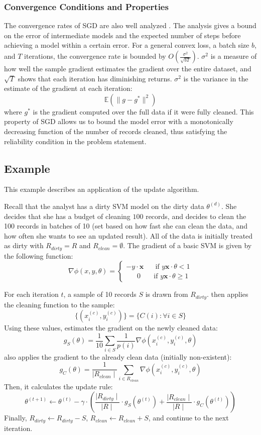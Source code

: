 \subsubsection{Convergence Conditions and Properties}
The convergence rates of SGD are also well analyzed \cite{dekel2012optimal,bertsekas2011incremental,zhao2014stochastic}. 
The analysis gives a bound on the error of intermediate models and the expected number of steps before achieving a model within a certain error. 
For a general convex loss, a batch size $b$, and $T$ iterations, the convergence rate is bounded by $O(\frac{\sigma^2}{\sqrt{bT}})$. 
$\sigma^2$ is a measure of how well the sample gradient estimates the gradient over the entire dataset, and $\sqrt{T}$ shows that each iteration has diminishing returns.
$\sigma^2$ is the variance in the estimate of the gradient at each iteration:
\[
\mathbb{E}(\|g - g^*\|^2)
\]
where $g^*$ is the gradient computed over the full data if it were fully cleaned.
This property of SGD allows us to bound the model error with a monotonically decreasing function of the number of records cleaned, thus satisfying the reliability condition in the problem statement.

\subsection{Example}
This example describes an application of the update algorithm.
\begin{example}\label{upex}
Recall that the analyst has a dirty SVM model on the dirty data $\theta^{(d)}$.
She decides that she has a budget of cleaning $100$ records, and decides to clean the 100 records in batches of 10 (set based on how fast she can clean the data, and how often she wants to see an updated result).
All of the data is initially treated as dirty with $R_{dirty} = R$ and $R_{clean} = \emptyset$.
The gradient of a basic SVM is given by the following function:
\[
\nabla\phi(x,y,\theta) =
\begin{cases}      
-y\cdot\boldsymbol{x} ~~~~~~ \text{ if } y\boldsymbol{x}\cdot\theta < 1 \\
~~~~~~~0\ ~~~~~~\text{ if } y\boldsymbol{x}\cdot\theta \geq 1      
\end{cases}
\]

For each iteration $t$, a sample of 10 records $S$ is drawn from $R_{dirty}$.
\sys then applies the cleaning function to the sample:
\[
\{(x_i^{(c)},y_i^{(c)})\} = \{C(i): \forall i \in S\}
\]
Using these values, \sys estimates the gradient on the newly cleaned data:
\[
g_{S}(\theta) = \frac{1}{10} \sum_{i \in S}\frac{1}{p(i)}\nabla\phi(x_i^{(c)},y_i^{(c)},\theta)
\]
\sys also applies the gradient to the already clean data (initially non-existent):
\[
g_C(\theta) = \frac{1}{\mid R_{clean}\mid}\sum_{i \in R_{clean}}\nabla\phi(x_i^{(c)},y_i^{(c)},\theta)
\]
Then, it calculates the update rule:
\[
	\theta^{(t+1)} \leftarrow \theta^{(t)} - \gamma \cdot(\frac{\mid R_{dirty} \mid}{\mid R \mid} \cdot g_S(\theta^{(t)}) + \frac{\mid R_{clean} \mid}{\mid R \mid} \cdot  g_C(\theta^{(t)}))
\] 
Finally, $R_{dirty} \leftarrow R_{dirty} - S$, $R_{clean} \leftarrow R_{clean} + S$, and continue to the next iteration.
\end{example}
